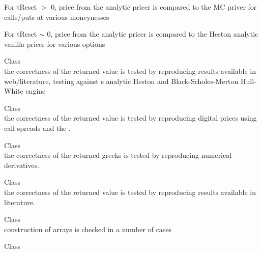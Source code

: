 \begin{DoxyRefList}
\begin{DoxyItemize}
\item For t\+Reset \texorpdfstring{$>$}{>} 0, price from the analytic pricer is compared to the MC priver for calls/puts at various moneynesses
\item For t\+Reset \texorpdfstring{$\sim$}{\string~} 0, price from the analytic pricer is compared to the Heston analytic vanilla pricer for various options 
\end{DoxyItemize}
\item[Class \doxylink{class_quant_lib_1_1_analytic_heston_hull_white_engine}{Quant\+Lib\+::Analytic\+Heston\+Hull\+White\+Engine} ]\hfill \\
\label{test__test000143}%
%
the correctness of the returned value is tested by reproducing results available in web/literature, testing against \textquotesingle{}s analytic Heston and Black-\/\+Scholes-\/\+Merton Hull-\/\+White engine  
\item[Class \doxylink{class_quant_lib_1_1_analytic_p_d_f_heston_engine}{Quant\+Lib\+::Analytic\+PDFHeston\+Engine} ]\hfill \\
\label{test__test000144}%
%
the correctness of the returned value is tested by reproducing digital prices using call spreads and the . 
\item[Class \doxylink{class_quant_lib_1_1_analytic_performance_engine}{Quant\+Lib\+::Analytic\+Performance\+Engine} ]\hfill \\
\label{test__test000118}%
%
the correctness of the returned greeks is tested by reproducing numerical derivatives.  
\item[Class \doxylink{class_quant_lib_1_1_analytic_two_asset_barrier_engine}{Quant\+Lib\+::Analytic\+Two\+Asset\+Barrier\+Engine} ]\hfill \\
\label{test__test000105}%
%
the correctness of the returned value is tested by reproducing results available in literature.  
\item[Class \doxylink{class_quant_lib_1_1_array}{Quant\+Lib\+::Array} ]\hfill \\
\label{test__test000031}%
%
construction of arrays is checked in a number of cases  
\item[Class \doxylink{class_quant_lib_1_1_barone_adesi_whaley_approximation_engine}{Quant\+Lib\+::Barone\+Adesi\+Whaley\+Approximation\+Engine} ]\hfill \\

\end{DoxyRefList}
